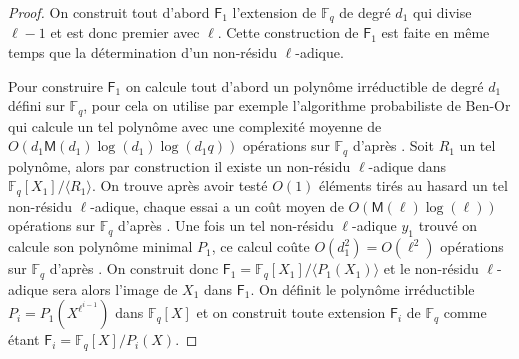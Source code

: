 \documentclass[10pt,a4paper]{book}
\theoremstyle{plain}
\theoremstyle{definition}
\theoremstyle{definition}
\theoremstyle{definition}
\theoremstyle{definition}
\theoremstyle{definition}
\theoremstyle{remark}
\newtheorem{rem}[thm]{Remarque}
\theoremstyle{remark}
\theoremstyle{definition}
\begin{document}
 \begin{proof}
  On construit tout d'abord $\mathsf{F}_1$ l'extension de $\mathbb{F}_q$ de degré $d_1$ qui divise $\ell-1$ et est donc premier avec $\ell$. Cette construction de $\mathsf{F}_1$ est faite en même temps que la détermination d'un non-résidu $\ell$-adique. 

Pour construire $\mathsf{F}_1$ on calcule tout d'abord un polynôme irréductible
de degré $d_1$ défini sur $\mathbb{F}_q$, pour cela on utilise par exemple 
l'algorithme probabiliste de Ben-Or qui calcule un tel polynôme avec une 
complexité moyenne de $O(d_1\mathsf{M}(d_1)\log(d_1)\log(d_1q))$ opérations sur
$\mathbb{F}_q$ d'après \cite[Theorem 14.42]{vzGJG03}.
 Soit $R_1$ un tel polynôme, alors par construction il existe un non-résidu $\ell$-adique dans $\mathbb{F}_q[X_1]/ \langle R_1 \rangle $. On trouve après avoir testé $O(1)$ éléments tirés au hasard un tel non-résidu $\ell$-adique, chaque essai a un coût moyen de $O(\mathsf{M}(\ell)\log(\ell))$ opérations sur $\mathbb{F}_q$ d'après \cite[11.1]{vzGJG03}. Une fois un tel non-résidu $\ell$-adique $y_1$ trouvé on calcule son polynôme minimal $P_1$, ce calcul coûte $O(d_1^2)=O(\ell^2)$ opérations sur $\mathbb{F}_q$ d'après \cite[Th. 3.4]{Shoup93}. On construit donc $\mathsf{F}_1=\mathbb{F}_q[X_1]/\langle P_1(X_1) \rangle$ et le non-résidu $\ell$-adique sera alors l'image de $X_1$ dans $\mathsf{F}_1$. On définit le polynôme irréductible $P_i=P_1(X^{\ell^{i-1}})$ dans $\mathbb{F}_q[X]$ et on construit toute extension $\mathsf{F}_{i}$ de $\mathbb{F}_{q}$ comme étant $\mathsf{F}_{i}=\mathbb{F}_q[X]/P_i(X)$. 
 
\end{proof}

\end{document}
